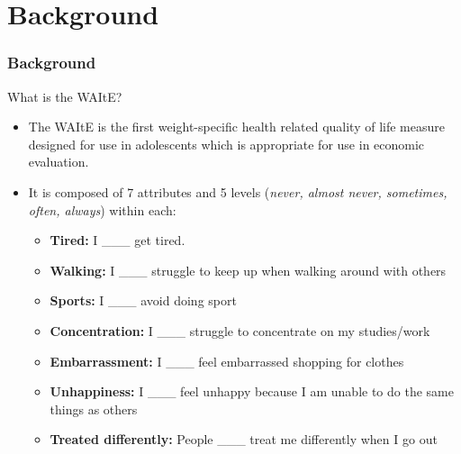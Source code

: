 \documentclass[t,compress,9pt,aspectratio=169]{beamer}
\begin{document}
\section{Background}
\begin{frame}[fragile]
\frametitle{Background}
\begin{block}{What is the WAItE?}
    \begin{itemize}
      \item The WAItE is the first weight-specific health related quality of life measure designed for use in adolescents which is appropriate for use in economic evaluation. 
      \item It is composed of 7 attributes and 5 levels (\textit{never, almost never, sometimes, often, always}) within each:
      \begin{itemize}
          \item \textbf{Tired:} I \_\_\_ get tired. %
          \item \textbf{Walking:} I \_\_\_ struggle to keep up when walking around with others
          \item \textbf{Sports:} I \_\_\_ avoid doing sport
          \item \textbf{Concentration:} I \_\_\_ struggle to concentrate on my studies/work
          \item \textbf{Embarrassment:} I \_\_\_ feel embarrassed shopping for clothes
          \item \textbf{Unhappiness:} I \_\_\_ feel unhappy because I am unable to do the same things as others
          \item \textbf{Treated differently:} People \_\_\_ treat me differently when I go out
      \end{itemize}
    \end{itemize}
\end{block}
\end{frame}
\end{document}
